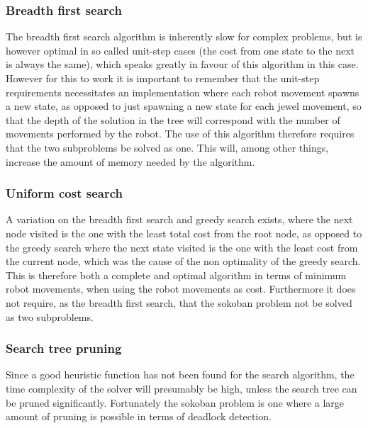 \subsubsection*{Breadth first search}
The breadth first search algorithm is inherently slow for complex problems, but is however optimal in so called unit-step cases (the cost from one state to the next is always the same), which speaks greatly in favour of this algorithm in this case. However for this to work it is important to remember that the unit-step requirements necessitates an implementation where each robot movement spawns a new state, as opposed to just spawning a new state for each jewel movement, so that the depth of the solution in the tree will correspond with the number of movements performed by the robot. The use of this algorithm therefore requires that the two subproblems be solved as one. This will, among other things, increase the amount of memory needed by the algorithm. 

\subsubsection*{Uniform cost search}
A variation on the breadth first search and greedy search exists, where the next node visited is the one with the least total cost from the root node, as opposed to the greedy search where the next state visited is the one with the least cost from the current node, which was the cause of the non optimality of the greedy search. This is therefore both a complete and optimal algorithm in terms of minimum robot movements, when using the robot movements as cost. Furthermore it does not require, as the breadth first search, that the sokoban problem not be solved as two subproblems.

\subsubsection*{Search tree pruning}
Since a good heuristic function has not been found for the search algorithm, the time complexity of the solver will presumably be high, unless the search tree can be pruned significantly. Fortunately the sokoban problem is one where a large amount of pruning is possible in terms of deadlock detection. 

